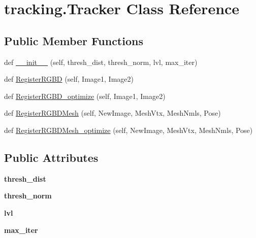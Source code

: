 \hypertarget{classtracking_1_1_tracker}{}\section{tracking.\+Tracker Class Reference}
\label{classtracking_1_1_tracker}
\subsection*{Public Member Functions}
\begin{DoxyCompactItemize}
\item 
def \hyperlink{classtracking_1_1_tracker_af4ec0591320a6a3186198e4afa34aa4a}{\+\_\+\+\_\+init\+\_\+\+\_\+} (self, thresh\+\_\+dist, thresh\+\_\+norm, lvl, max\+\_\+iter)
\item 
def \hyperlink{classtracking_1_1_tracker_a74ff598370a1334ee1cf35a1d8c3c5b8}{Register\+R\+G\+BD} (self, Image1, Image2)
\item 
def \hyperlink{classtracking_1_1_tracker_a67305bad91e92f81957982b6b92556cc}{Register\+R\+G\+B\+D\+\_\+optimize} (self, Image1, Image2)
\item 
def \hyperlink{classtracking_1_1_tracker_a99da5721b34cdb54cf89534ab2a77f35}{Register\+R\+G\+B\+D\+Mesh} (self, New\+Image, Mesh\+Vtx, Mesh\+Nmls, Pose)
\item 
def \hyperlink{classtracking_1_1_tracker_a435754ca561996d43da1bd5d91b9ad36}{Register\+R\+G\+B\+D\+Mesh\+\_\+optimize} (self, New\+Image, Mesh\+Vtx, Mesh\+Nmls, Pose)
\end{DoxyCompactItemize}
\subsection*{Public Attributes}
\begin{DoxyCompactItemize}
\item 
\mbox{\label{classtracking_1_1_tracker_a1f46d5b2dae7afdaa90a82c9c9105f44}} 
{\bfseries thresh\+\_\+dist}
\item 
\mbox{\label{classtracking_1_1_tracker_acfd351ce92170c6fe1f5627412ca3a6b}} 
{\bfseries thresh\+\_\+norm}
\item 
\mbox{\label{classtracking_1_1_tracker_a08950fc3a5d4f62953bb2c5ee5f8cb16}} 
{\bfseries lvl}
\item 
\mbox{\label{classtracking_1_1_tracker_afa1bc9948ab57bffca4ea0fb99a324de}} 
{\bfseries max\+\_\+iter}
\end{DoxyCompactItemize}


